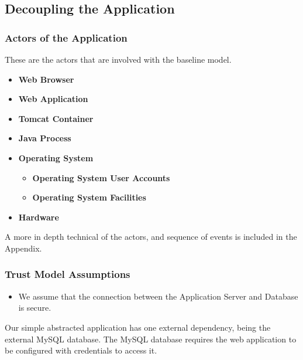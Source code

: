 \documentclass[11pt, a4paper, notitlepage]{article}
\begin{document}
\makeblankpage

\subsection*{Decoupling the Application}
\subsubsection*{Actors of the Application}
These are the actors that are involved with the baseline model.
\begin{itemize}
	\item \textbf {Web Browser} \\
	\item \textbf{Web Application} \\
	
	\item \textbf{Tomcat Container} \\
	\item \textbf{Java Process} \\
	\item \textbf {Operating System} \\
	\begin{itemize}
		\item \textbf {Operating System User Accounts } \\
		\item \textbf {Operating System Facilities } \\
	\end{itemize}
	\item \textbf {Hardware} \\
\end{itemize}

A more in depth technical of the actors, and sequence of events is included in the Appendix.

\subsubsection*{Trust Model Assumptions}
\begin{itemize}
\item We assume that the connection between the Application Server and Database is secure.
\end{itemize}








Our simple abstracted application has one external dependency, being the external MySQL database.  The MySQL database requires the web application to be configured with credentials to access it. 
\end{document}
